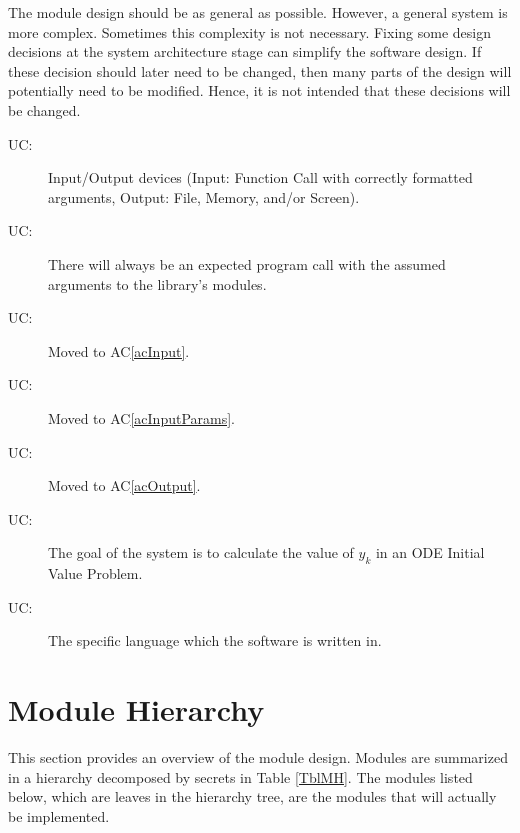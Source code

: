 \documentclass[12pt, titlepage]{article}
\newcounter{ucnum}
\newcommand{\uctheucnum}{UC\theucnum}
\begin{document}
The module design should be as general as possible. However, a general system is
more complex. Sometimes this complexity is not necessary. Fixing some design
decisions at the system architecture stage can simplify the software design. If
these decision should later need to be changed, then many parts of the design
will potentially need to be modified. Hence, it is not intended that these
decisions will be changed.

\begin{description}
\item[ \uctheucnum \label{ucIO}:] Input/Output devices
  (Input: Function Call with correctly formatted arguments, Output: File, Memory, and/or Screen).
\item[ \uctheucnum \label{ucInput}:] There will always be
an expected program call with the assumed arguments to the library's modules.
\item[ \uctheucnum \label{ucInput}:] Moved to AC\ref{acInput}.
\item[ \uctheucnum \label{ucInputParams}:] Moved to AC\ref{acInputParams}.
\item[ \uctheucnum \label{ucOutput}:] Moved to AC\ref{acOutput}.
\item[ \uctheucnum \label{ucGoal}:] The goal of the system is to
calculate the value of $y_k$ in an ODE Initial Value Problem.
\item[ \uctheucnum \label{ucLanguage}:] The specific language
which the software is written in.
\end{description}


\section{Module Hierarchy} \label{SecMH}

This section provides an overview of the module design. Modules are summarized
in a hierarchy decomposed by secrets in Table \ref{TblMH}. The modules listed
below, which are leaves in the hierarchy tree, are the modules that will
actually be implemented.
\end{document}
